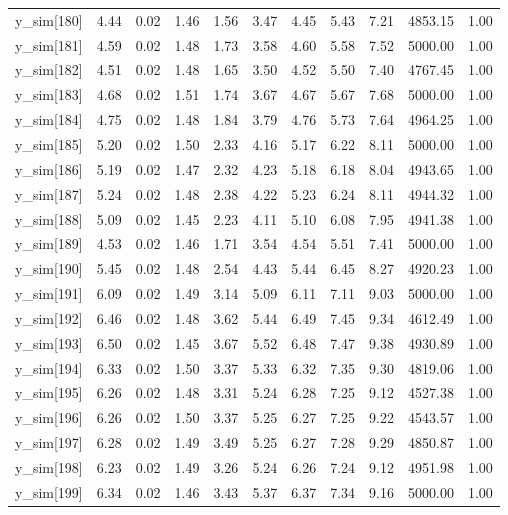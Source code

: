 \begin{table}[ht]
\begin{tabular}{rrrrrrrrrrr}
  y\_sim[180] & 4.44 & 0.02 & 1.46 & 1.56 & 3.47 & 4.45 & 5.43 & 7.21 & 4853.15 & 1.00 \\ 
  y\_sim[181] & 4.59 & 0.02 & 1.48 & 1.73 & 3.58 & 4.60 & 5.58 & 7.52 & 5000.00 & 1.00 \\ 
  y\_sim[182] & 4.51 & 0.02 & 1.48 & 1.65 & 3.50 & 4.52 & 5.50 & 7.40 & 4767.45 & 1.00 \\ 
  y\_sim[183] & 4.68 & 0.02 & 1.51 & 1.74 & 3.67 & 4.67 & 5.67 & 7.68 & 5000.00 & 1.00 \\ 
  y\_sim[184] & 4.75 & 0.02 & 1.48 & 1.84 & 3.79 & 4.76 & 5.73 & 7.64 & 4964.25 & 1.00 \\ 
  y\_sim[185] & 5.20 & 0.02 & 1.50 & 2.33 & 4.16 & 5.17 & 6.22 & 8.11 & 5000.00 & 1.00 \\ 
  y\_sim[186] & 5.19 & 0.02 & 1.47 & 2.32 & 4.23 & 5.18 & 6.18 & 8.04 & 4943.65 & 1.00 \\ 
  y\_sim[187] & 5.24 & 0.02 & 1.48 & 2.38 & 4.22 & 5.23 & 6.24 & 8.11 & 4944.32 & 1.00 \\ 
  y\_sim[188] & 5.09 & 0.02 & 1.45 & 2.23 & 4.11 & 5.10 & 6.08 & 7.95 & 4941.38 & 1.00 \\ 
  y\_sim[189] & 4.53 & 0.02 & 1.46 & 1.71 & 3.54 & 4.54 & 5.51 & 7.41 & 5000.00 & 1.00 \\ 
  y\_sim[190] & 5.45 & 0.02 & 1.48 & 2.54 & 4.43 & 5.44 & 6.45 & 8.27 & 4920.23 & 1.00 \\ 
  y\_sim[191] & 6.09 & 0.02 & 1.49 & 3.14 & 5.09 & 6.11 & 7.11 & 9.03 & 5000.00 & 1.00 \\ 
  y\_sim[192] & 6.46 & 0.02 & 1.48 & 3.62 & 5.44 & 6.49 & 7.45 & 9.34 & 4612.49 & 1.00 \\ 
  y\_sim[193] & 6.50 & 0.02 & 1.45 & 3.67 & 5.52 & 6.48 & 7.47 & 9.38 & 4930.89 & 1.00 \\ 
  y\_sim[194] & 6.33 & 0.02 & 1.50 & 3.37 & 5.33 & 6.32 & 7.35 & 9.30 & 4819.06 & 1.00 \\ 
  y\_sim[195] & 6.26 & 0.02 & 1.48 & 3.31 & 5.24 & 6.28 & 7.25 & 9.12 & 4527.38 & 1.00 \\ 
  y\_sim[196] & 6.26 & 0.02 & 1.50 & 3.37 & 5.25 & 6.27 & 7.25 & 9.22 & 4543.57 & 1.00 \\ 
  y\_sim[197] & 6.28 & 0.02 & 1.49 & 3.49 & 5.25 & 6.27 & 7.28 & 9.29 & 4850.87 & 1.00 \\ 
  y\_sim[198] & 6.23 & 0.02 & 1.49 & 3.26 & 5.24 & 6.26 & 7.24 & 9.12 & 4951.98 & 1.00 \\ 
  y\_sim[199] & 6.34 & 0.02 & 1.46 & 3.43 & 5.37 & 6.37 & 7.34 & 9.16 & 5000.00 & 1.00 \\ 

\end{tabular}
\end{table}
